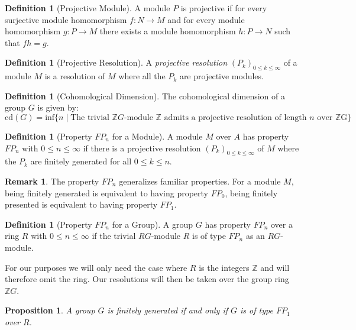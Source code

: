 \documentclass[12pt,parskip=full]{report}
\theoremstyle{plain}
\newtheorem{prop}[thm]{Proposition}
\theoremstyle{definition}
\newtheorem{rmk}[thm]{Remark}
\newtheorem{dfn}[thm]{Definition}
\begin{document}
\begin{dfn}
    [Projective Module]
    A module \(P\) is projective if for every surjective module homomorphism \(f: N\to M\) and for every module homomorphism \(g: P\to M\) there exists a module homomorphism \(h: P\to N\) such that \(fh = g\).
\end{dfn}

\begin{dfn}
    [Projective Resolution]
    A \emph{projective resolution} \((P_k)_{0\leq k\leq \infty}\) of a module \(M\) is a resolution of \(M\) where all the \(P_k\) are projective modules.
\end{dfn}

\begin{dfn}
[Cohomological Dimension]
The cohomological dimension of a group \(G\) is given by:
\[
    \text{cd}(G) = \text{inf}\{n\mid\text{The trivial }\mathbb{Z}G\text{-module }\mathbb{Z}\text{ admits a projective resolution of length \(n\) over \(\mathbb{Z}\)G}\}
\]
\end{dfn}

\begin{dfn}
[Property \(FP_n\) for a Module]

A module \(M\) over \(A\) has property \(FP_n\) with \(0\leq n\leq \infty\) if there is a projective resolution \((P_k)_{0\leq k\leq \infty}\) of \(M\) where the \(P_k\) are finitely generated for all \(0\leq k\leq n\).
\end{dfn}

\begin{rmk}
The property \(FP_n\) generalizes familiar properties. For a module \(M\), being finitely generated is equivalent to having property \(FP_0\), being finitely presented is equivalent to having property \(FP_1\).
\end{rmk}

\begin{dfn}
[Property \(FP_n\) for a Group]

A group \(G\) has property \(FP_n\) over a ring \(R\) with \(0\leq n\leq \infty\) if the trivial \(RG\)-module \(R\) is of type \(FP_n\) as an \(RG\)-module.
\end{dfn}

For our purposes we will only need the case where \(R\) is the integers \(\mathbb{Z}\) and will therefore omit the ring. Our resolutions will then be taken over the group ring \(\mathbb{Z}G\).

\begin{prop}
A group \(G\) is finitely generated if and only if \(G\) is of type \(FP_1\) over \(R\).
\end{prop}
\end{document}
